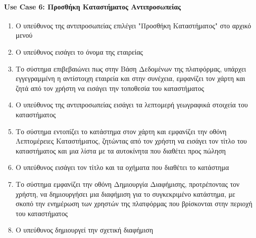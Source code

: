 \documentclass{../ol-softwaremanual}
\begin{document}
	\paragraph{}
	
	
	\paragraph{\en Use Case 6: \gr Προσθήκη Καταστήματος Αντιπροσωπείας}
	
	\begin{enumerate}
		\item Ο υπεύθυνος της αντιπροσωπείας επιλέγει \en"\gr Προσθήκη Καταστήματος\en" \gr στο αρχικό μενού
		\item Ο υπεύθυνος εισάγει το όνομα της εταιρείας
		\item Το σύστημα επιβεβαιώνει πως στην Βάση Δεδομένων της πλατφόρμας, υπάρχει εγγεγραμμένη η αντίστοιχη εταιρεία και στην συνέχεια, εμφανίζει τον χάρτη και ζητά από τον χρήστη να εισάγει την τοποθεσία του καταστήματος
		\item Ο υπεύθυνος της αντιπροσωπείας εισάγει τα λεπτομερή γεωγραφικά στοιχεία του καταστήματος
		\item Το σύστημα εντοπίζει το κατάστημα στον χάρτη και εμφανίζει την οθόνη Λεπτομέρειες Καταστήματος, ζητώντας από τον χρήστη να εισάγει τον τίτλο του καταστήματος και μια λίστα με τα αυτοκίνητα που διαθέτει προς πώληση
		\item Ο υπεύθυνος εισάγει τον τίτλο και τα οχήματα που διαθέτει το κατάστημα
		\item Το σύστημα εμφανίζει την οθόνη Δημιουργία Διαφήμισης, προτρέποντας τον χρήστη, να δημιουργήσει μια διαφήμιση για το συγκεκριμένο κατάστημα, με σκοπό την ενημέρωση των χρηστών της πλατφόρμας που βρίσκονται στην περιοχή του καταστήματος
		\item Ο υπεύθυνος δημιουργεί την σχετική διαφήμιση
	\end{enumerate}
	
\end{document}

